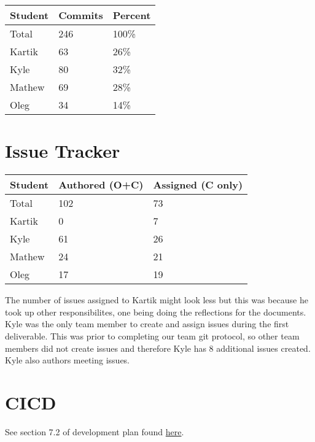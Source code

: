 \documentclass{article}
\begin{document}
\begin{table}[H]
    \centering
    \begin{tabular}{lll}
    \toprule
    \textbf{Student} & \textbf{Commits} & \textbf{Percent}\\
    \midrule
    Total & 246 & 100\% \\
    Kartik & 63 & 26\%\\
    Kyle   & 80 & 32\%\\
    Mathew & 69 & 28\%\\
    Oleg   & 34 & 14\%\\
    \bottomrule
    \end{tabular}
    \end{table}
\section{Issue Tracker}


\begin{table}[H]
\centering
\begin{tabular}{lll}
\toprule
\textbf{Student} & \textbf{Authored (O+C)} & \textbf{Assigned (C only)}\\
\midrule
Total & 102 & 73 \\
Kartik & 0 & 7\\
Kyle   & 61 & 26\\
Mathew & 24 & 21\\
Oleg   & 17 & 19\\
\bottomrule
\end{tabular}
\end{table}

The number of issues assigned to Kartik might look less but this was because he took up other responsibilites, one being doing the reflections for the documents.\\
Kyle was the only team member to create and assign issues during the first deliverable. This was prior to completing our team git protocol, so other team members did not create issues and therefore Kyle has 8 additional issues created. Kyle also authors meeting issues.
\section{CICD}

See section 7.2 of development plan found \href{https://github.com/OKKM-insights/OKKM.insights/blob/main/docs/DevelopmentPlan/DevelopmentPlan.pdf}{here}.

\end{document}
